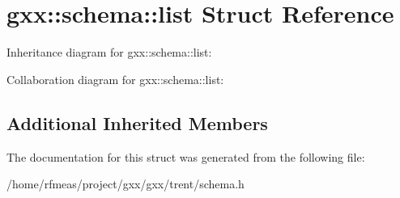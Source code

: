 \hypertarget{structgxx_1_1schema_1_1list}{}\section{gxx\+:\+:schema\+:\+:list Struct Reference}
\label{structgxx_1_1schema_1_1list}


Inheritance diagram for gxx\+:\+:schema\+:\+:list\+:


Collaboration diagram for gxx\+:\+:schema\+:\+:list\+:
\subsection*{Additional Inherited Members}


The documentation for this struct was generated from the following file\+:\begin{DoxyCompactItemize}
\item 
/home/rfmeas/project/gxx/gxx/trent/schema.\+h\end{DoxyCompactItemize}
